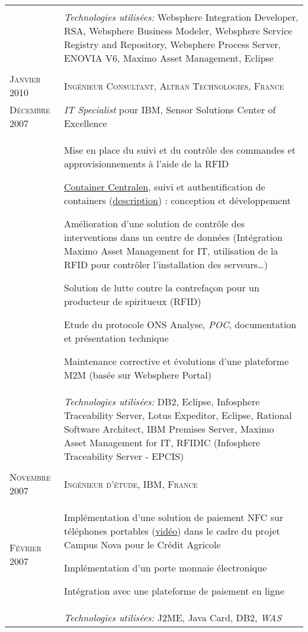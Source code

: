 \begin{longtable}{R{2.5cm}|p{14.8cm}}
{\begin{compactitem}
 		\end{compactitem}
 	}\\&
 	\footnotesize{\emph{Technologies utilisées:} Websphere Integration Developer, RSA, Websphere Business Modeler, Websphere Service Registry and Repository, 
 	Websphere Process Server, ENOVIA V6, Maximo Asset Management, Eclipse }\\
  \\
 	\textsc{Janvier 2010} & \textsc{Ingénieur Consultant, Altran Technologies, France}\\
 	\textsc{Décembre 2007}& \emph{IT Specialist} pour IBM, Sensor Solutions Center of Excellence\\&
 	\small{
 		\begin{compactitem}
 		  \item Mise en place du suivi et du contrôle des commandes et approvisionnements à l'aide de la RFID
 		  \item \href{http://www.container-centralen.com/}{Container Centralen}, suivi et authentification de containers (\href{http://www.container-centralen.co.uk/rfid/history.aspx}{description}) : conception et développement
 		  \item Amélioration d'une solution de contrôle des interventions dans un centre de données 
 	 	(Intégration Maximo Asset Management for IT, utilisation de la RFID pour contrôler l'installation des serveurs\ldots)
 	 	  \item Solution de lutte contre la contrefaçon pour un producteur de spiritueux (RFID)
 	 	  \item {Etude du protocole ONS} Analyse, \emph{POC}, documentation et présentation technique
 	 	  \item Maintenance corrective et évolutions d'une plateforme M2M (basée sur Websphere Portal)
 		\end{compactitem}
 	}\\&
 	\footnotesize{\emph{Technologies utilisées:} DB2, Eclipse, Infosphere Traceability Server, Lotus Expeditor, Eclipse, 
 	Rational Software Architect, IBM Premises Server, Maximo Asset Management for IT, RFIDIC (Infosphere Traceability Server - EPCIS) }\\
 \\
 	\textsc{Novembre 2007} & \textsc{Ingénieur d'étude, IBM, France} \\
 	\textsc{Février 2007}&
 	\small{
 	 	Implémentation d'une solution de paiement NFC sur téléphones portables (\href{http://www.nouvo.ch/s-007}{vidéo}) 
 	 	dans le cadre du projet Campus Nova pour le Crédit Agricole
 	 	\begin{compactitem}
 	 	  \item Implémentation d'un porte monnaie électronique
 	 	  \item Intégration avec une plateforme de paiement en ligne
 	 	\end{compactitem}
 	 	
	}\\&
 	\footnotesize{\emph{Technologies utilisées:} J2ME, Java Card, DB2, \emph{WAS}}\\
\end{longtable}
